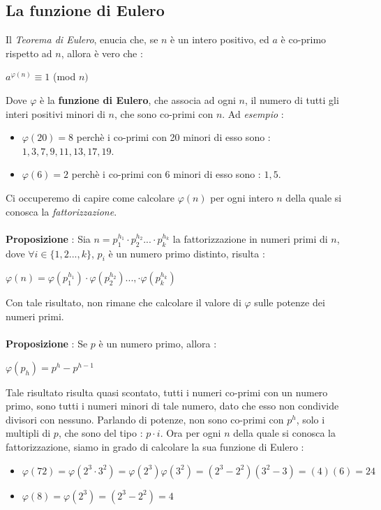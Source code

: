 \documentclass[12pt, letterpaper]{article}
\begin{document}
\subsection{La funzione di Eulero}
Il \textit{Teorema di Eulero}, enucia che, se \(n\) è un intero positivo, ed \(a\) è co-primo rispetto ad \(n\), allora
è vero che :
\begin{center}
    \(a^{\varphi(n)}\equiv 1\) (mod \(n)\)
\end{center} 
Dove \(\varphi\) è la \textbf{funzione di Eulero}, che associa ad ogni \(n\), il numero di tutti gli interi 
positivi minori di \(n\), che sono co-primi con \(n\). Ad \textit{esempio} :\begin{itemize}
    \item \(\varphi(20)=8\) perchè i co-primi con 20 minori di esso sono : \(1,3,7,9,11,13,17,19\).
    \item \(\varphi(6)=2\) perchè i co-primi con 6 minori di esso sono : \(1,5\).
\end{itemize}
Ci occuperemo di capire come calcolare \(\varphi(n)\) per ogni intero \(n\) della quale si conosca la \textit{fattorizzazione}.
\\\hphantom{.}\\\textbf{Proposizione} : Sia \(n=p_1^{h_1}\cdot p_2^{h_2}...\cdot p_k^{h_k}\) la fattorizzazione in numeri 
primi di \(n\), dove \(\forall i \in \{1,2...,k\}\), \(p_i\) è un numero primo distinto, risulta :\begin{center}
    \(
        \varphi(n)=  \varphi(p_1^{h_1})\cdot\varphi(p_2^{h_2})...,\cdot  \varphi(p_k^{h_k})
    \)
\end{center}
Con tale risultato, non rimane che calcolare il valore di \(\varphi\) sulle potenze dei numeri primi.
\\\hphantom{.}\\\textbf{Proposizione }: Se \(p\) è un numero primo, allora :\begin{center}
    \(
        \varphi(p_{h}) = p^h-p^{h-1} 
    \)
\end{center}
Tale risultato risulta quasi scontato, tutti i numeri co-primi con un numero primo, sono tutti i numeri minori 
di tale numero, dato che esso non condivide divisori con nessuno. Parlando di potenze, non sono co-primi con 
\(p^h\), solo i multipli di \(p\), che sono del tipo : \(p\cdot i\). Ora per ogni \(n\) della quale si conosca la fattorizzazione, 
siamo in grado di calcolare la sua funzione di Eulero : \begin{itemize}
    \item \(\varphi(72)=\varphi(2^3\cdot 3^2)=\varphi(2^3)\varphi(3^2)=(2^3-2^2)(3^2-3)=(4)(6)=24\)
    \item \(\varphi(8)=\varphi(2^3)=(2^3-2^2)=4\)
\end{itemize}
\end{document}
